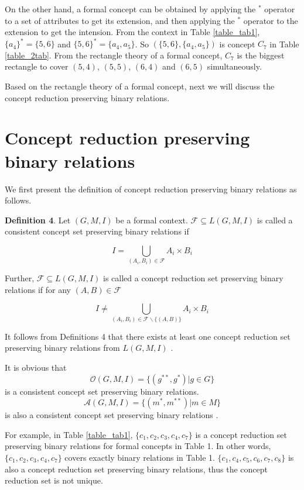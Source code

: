 \documentclass[11pt]{article}
\numberwithin{equation}{subsection}
\begin{document}
On the other hand, a formal concept can be obtained by applying the $^*$ operator to a set of attributes to get its extension, and then applying the $^*$ operator to the extension to get the intension.
From the context in  Table \ref{table_tab1},  $\{a_4\}^*= \{5,6\}$ and $\{5,6\}^*=\{a_4,a_5\}$. So $(\{5,6\}, \{a_4,a_5\})$ is concept $C_7$ in  Table \ref{table_2tab}.
From the rectangle theory of a formal concept, $C_7$ is the biggest rectangle to cover $(5,4)$, $(5,5)$, $(6,4)$ and $(6,5)$ simultaneously.


Based on the rectangle theory of a formal concept, next we will discuss the concept reduction preserving binary relations.

\section{Concept reduction preserving binary relations} \label{s2}


We first present the definition of concept reduction preserving binary relations as follows.

\textbf{Definition 4}. \cite{Cao,Wei} Let $(G, M, I)$ be a formal context. $\mathcal{F}\subseteq L(G, M, I)$ is called a  consistent concept set preserving binary relations
if

\[ I=\bigcup\limits_{(A_i,B_i)\in \mathcal{F}} A_i\times B_i   \]

Further, $\mathcal{F}\subseteq L(G, M, I)$ is called a  concept reduction set preserving binary relations if for any $(A,B)\in \mathcal{F}$

\[ I\neq \bigcup\limits_{(A_i,B_i)\in \mathcal{F}\backslash \{(A,B) \}} A_i\times B_i   \]

It follows from  Definitions 4 that there
exists at least one concept reduction set preserving binary relations from $L(G, M, I)$ \cite{Cao}.

It is obvious that \[ \mathcal{O}(G,M,I)=\{ (g^{**},g^*)  | g\in G \} \] is a  consistent concept set preserving binary relations.
 \[ \mathcal{A}(G,M,I)=\{ (m^{*},m^{**})  | m\in M \} \] is also a  consistent concept set preserving binary relations \cite{Cao}.

For example, in Table \ref{table_tab1}, $\{c_1, c_2, c_3, c_4, c_7 \}$ is a  concept reduction set preserving binary relations for formal concepts in  Table 1. In other words, $\{c_1, c_2, c_3, c_4, c_7 \}$ covers exactly binary relations  in  Table 1.
 $\{c_1, c_4, c_5, c_6, c_7,  c_8\}$ is also a  concept reduction set preserving binary relations, thus the concept reduction set is not unique.
\end{document}
